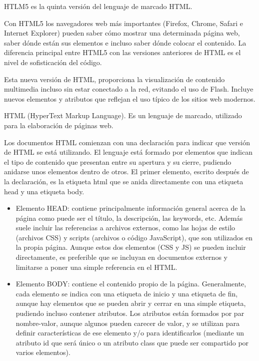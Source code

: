 HTLM5 es la quinta versión del lenguaje de marcado HTML.


Con HTML5 los navegadores web más importantes (Firefox, Chrome, Safari e Internet Explorer) pueden saber cómo mostrar una determinada página web, saber dónde están sus elementos e incluso saber dónde colocar el contenido. La diferencia principal entre HTML5 con las versiones anteriores de HTML es el nivel de sofisticación del código.


Esta nueva versión de HTML, proporciona la visualización de contenido multimedia incluso sin estar conectado a la red, evitando el uso de Flash. Incluye nuevos elementos y atributos que reflejan el uso típico de los sitios web modernos. 


HTML (HyperText Markup Language). Es un lenguaje de marcado,  utilizado para la elaboración de páginas web.


Los documentos HTML comienzan con una declaración para indicar que versión de HTML se está utilizando. El lenguaje está formado por elementos que indican el tipo de contenido que presentan entre su apertura y su cierre, pudiendo anidarse unos elementos dentro de otros. El primer elemento, escrito después de la declaración, es la etiqueta html que se anida directamente con una etiqueta head y una etiqueta body.

\begin{itemize}
\item Elemento HEAD: contiene principalmente información general acerca de la página como puede ser el título, la descripción, las keywords, etc. Además suele incluir las referencias a archivos externos, como las hojas de estilo (archivos CSS) y scripts (archivos o código JavaScript), que son utilizados en la propia página. Aunque estos dos elementos (CSS y JS) se pueden incluir directamente, es preferible que se incluyan en documentos externos y limitarse a poner una simple referencia en el HTML.
\item Elemento BODY: contiene el contenido propio de la página.
Generalmente, cada elemento se indica con una etiqueta de inicio y una etiqueta de fin, aunque hay elementos que se pueden abrir y cerrar en una simple etiqueta,  pudiendo incluso contener atributos. Los atributos están formados por par nombre-valor, aunque algunos pueden carecer de valor, y se utilizan para definir características de ese elemento y/o para identificarlos (mediante un atributo id que será único o un atributo class que puede ser compartido por varios elementos).
\end{itemize}


